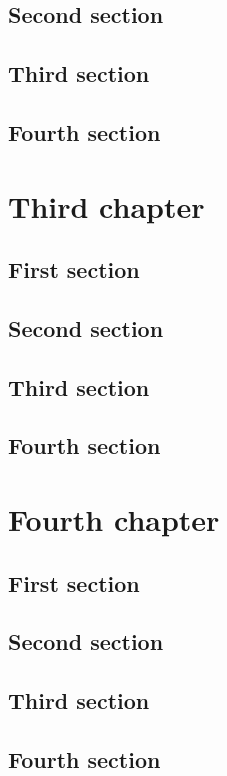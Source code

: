 \documentclass{researchbook}
\theoremstyle{plain}
\theoremstyle{definition}
\theoremstyle{remark}
\begin{document}
\section{Second section}\lipsum
\section{Third section}\lipsum
\section{Fourth section}\lipsum


\chapter{Third chapter}

\section{First section}\lipsum
\section{Second section}\lipsum
\section{Third section}\lipsum
\section{Fourth section}\lipsum


\chapter{Fourth chapter}

\section{First section}\lipsum
\section{Second section}\lipsum
\section{Third section}\lipsum
\section{Fourth section}\lipsum
\end{document}
